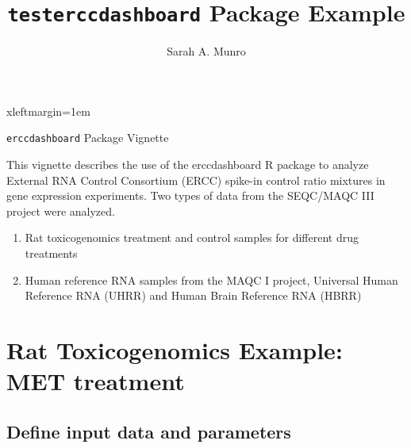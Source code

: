 \documentclass{article}
\begin{document}



 {xleftmargin=1em}
\renewenvironment{Schunk}{\vspace{\topsep}}{\vspace{\topsep}}
    
\title{{\tt testerccdashboard} Package Example}
\author{Sarah A. Munro}
\maketitle

\begin{center}
\Large
{\tt erccdashboard} Package Vignette
\normalsize
\end{center}
This vignette describes the use of the erccdashboard R package to analyze 
External RNA Control Consortium (ERCC) spike-in control ratio mixtures in gene
expression experiments. Two types of data from the SEQC/MAQC III project were analyzed.
\begin{enumerate}
  \item Rat toxicogenomics treatment and control samples for different drug 
  treatments
  \item Human reference RNA samples from the MAQC I project, Universal Human 
  Reference RNA (UHRR) and Human Brain Reference RNA (HBRR)
\end{enumerate}

\section{Rat Toxicogenomics Example: MET treatment}
\subsection{Define input data and parameters}
\end{document}
